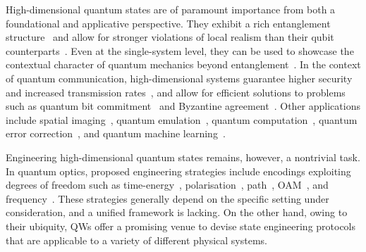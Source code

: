 High-dimensional quantum states are of paramount importance from both a foundational and applicative perspective. They exhibit a rich entanglement structure~\cite{horodecki2009quantum} and allow for stronger violations of local realism than their qubit counterparts~\cite{vértesi2010closing,brunner2014bell, lapkiewicz2011experimental}.
Even at the single-system level, they can be used to showcase the contextual character of quantum mechanics beyond entanglement~\cite{klyachko2008simple,lapkiewicz2011experimental}. 
In the context of quantum communication, high-dimensional systems guarantee higher security and increased transmission rates~\cite{bechmannpasquinucci2000quantum, cerf2002security, bru2002optimal, acin2003security, karimipour2002quantum, durt2004security, nunn2013largealphabet, mower2013highdimensional, lee2014entanglementbased, zhong2015photonefficient}, and allow for efficient solutions to problems such as quantum bit commitment~\cite{langford2004measuring} and  Byzantine agreement~\cite{fitzi2001quantum}.
Other applications include spatial imaging~\cite{howland2013efficient}, quantum emulation~\cite{buluta2009quantum,neeley2009emulation}, quantum computation~\cite{bartlett2002quantum, ralph2007efficient,lanyon2008simplifying,campbell2012magicstate,campbell2014enhanced}, quantum error correction~\cite{chuang1997bosonic,duclos-cianci2013kitaev,michael2016class}, and quantum machine learning~\cite{paparo2014quantum}.

Engineering high-dimensional quantum states remains, however, a nontrivial task.
In quantum optics, proposed engineering strategies include encodings exploiting degrees of freedom such as time-energy~\cite{thew2004belltype, bessire2014versatile}, polarisation~\cite{bogdanov2004qutrit}, path~\cite{osullivanhale2005pixel,hu2020experimental}, \ac{OAM}~\cite{mair2001entanglement, mclaren2012entangled, krenn2013entangled, krenn2014generation, zhang2016engineering}, and frequency~\cite{bernhard2013shaping, jin2016simple}. These strategies generally depend on the specific setting under consideration, and a unified framework is lacking. 
On the other hand, owing to their ubiquity, QWs offer a promising venue to devise state engineering protocols that are applicable to a variety of different physical systems.

